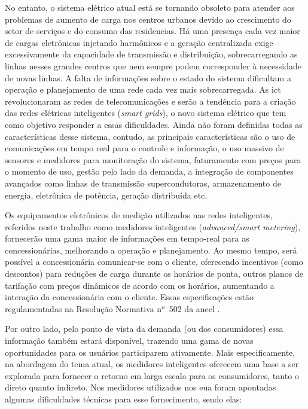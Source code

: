 No entanto, o sistema elétrico atual está se tornando obsoleto para atender aos problemas de
aumento de carga nos centros urbanos devido ao crescimento do setor
de serviços e do consumo das residencias. Há uma presença cada vez maior
de cargas eletrônicas injetando harmônicos e a geração centralizada exige
excessivamente da capacidade de transmissão e distribuição,
sobrecarregando as linhas nesses grandes centros que nem sempre podem
corresponder à necessidade de novas linhas. A falta de informações sobre o
estado do sistema dificultam a operação e planejamento de uma rede cada vez mais
sobrecarregada. As \gls{ict} revolucionaram as redes de telecomunicações e
serão a tendência para a criação das redes elétricas inteligentes (\emph{smart
grids}), o novo sistema elétrico que tem como objetivo responder a essas
dificuldades. Ainda não foram definidas todas as características desse sistema,
contudo, as principais características são o uso de comunicações em tempo real
para o controle e informação, o uso massivo de sensores e medidores para
monitoração do sistema, faturamento com preços para o momento de uso,
gestão pelo lado da demanda, a integração de
componentes avançados como linhas de transmissão supercondutoras,
armazenamento de energia, eletrônica de potência, geração distribuída
etc.  \cite{dissert_caires,aceee_2010_estudos_feedback}

Os equipamentos eletrônicos de medição utilizados nas redes inteligentes,
referidos neste trabalho como medidores inteligentes
(\emph{advanced/smart metering}), fornecerão uma gama maior de
informações em tempo-real para as concessionárias, melhorando a
operação e planejamento. Ao mesmo tempo, será possível a
concessionária comunicar-se com o cliente, oferecendo incentivos (como
descontos) para reduções de carga durante os horários de ponta, outros
planos de tarifação com preços dinâmicos de acordo com os horários,
aumentando a interação da concessionária com o cliente. Essas
especificações estão regulamentadas na Resolução Normativa n$^o$~502
da \gls{aneel} \cite{ren502}.

Por outro lado, pelo ponto de vista da demanda (ou dos consumidores) essa
informação também estará disponível, trazendo uma gama de novas oportunidades
para os usuários participarem ativamente. Mais especificamente, na abordagem do
tema atual, os medidores inteligentes oferecem uma base
a ser explorada para fornecer o retorno em larga escala para os consumidores,
tanto o direto quanto indireto. Nos medidores utilizados nos \gls{eua}
foram apontadas algumas dificuldades técnicas para esse fornecimento,
sendo elas:

